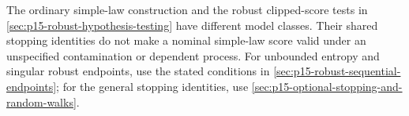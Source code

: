 The ordinary simple-law construction and the robust clipped-score tests
in \cref{sec:p15-robust-hypothesis-testing} have different model classes.
Their shared stopping identities do not make a nominal simple-law score
valid under an unspecified contamination or dependent process. For
unbounded entropy and singular robust endpoints, use the stated conditions
in \cref{sec:p15-robust-sequential-endpoints}; for the general stopping
identities, use \cref{sec:p15-optional-stopping-and-random-walks}.
